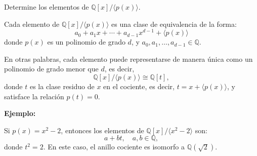 Determine los elementos de \( \mathbb{Q}[x] / \langle p(x) \rangle \).

Cada elemento de \( \mathbb{Q}[x] / \langle p(x) \rangle \) es una clase de equivalencia de la forma:
\[
a_0 + a_1 x + \cdots + a_{d-1} x^{d-1} + \langle p(x) \rangle
\]
donde \( p(x) \) es un polinomio de grado \( d \), y \( a_0, a_1, \dots, a_{d-1} \in \mathbb{Q} \).

En otras palabras, cada elemento puede representarse de manera única como un polinomio de grado menor que \( d \), es decir,
\[
\mathbb{Q}[x] / \langle p(x) \rangle \cong \mathbb{Q}[t],
\]
donde \( t \) es la clase residuo de \( x \) en el cociente, es decir, \( t = x + \langle p(x) \rangle \), y satisface la relación \( p(t) = 0 \).

\textbf{Ejemplo:}

Si \( p(x) = x^2 - 2 \), entonces los elementos de \( \mathbb{Q}[x] / \langle x^2 - 2 \rangle \) son:
\[
a + b t, \quad a, b \in \mathbb{Q},
\]
donde \( t^2 = 2 \). En este caso, el anillo cociente es isomorfo a \( \mathbb{Q}(\sqrt{2}) \).

